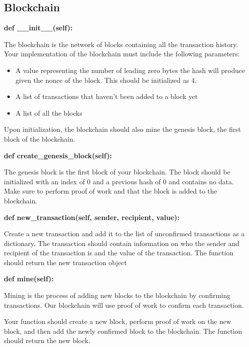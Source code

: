 \documentclass{article}
\begin{document}
\subsection{Blockchain}
\textbf{def \_\_init\_\_(self):} \par
The blockchain is the network of blocks containing all the transaction history. Your implementation of the blockchain must include the following parameters:
\begin{itemize}
  \item A value representing the number of leading zero bytes the hash will produce given the nonce of the block. This should be initialized as 4.
  \item A list of transactions that haven't been added to a block yet
  \item A list of all the blocks
\end{itemize}
Upon initialization, the blockchain should also mine the genesis block, the first block of the blockchain.\vspace{5mm}

\textbf{def create\_genesis\_block(self):}\par
The genesis block is the first block of your blockchain. The block should be initialized with an index of 0 and a previous hash of 0 and contains no data. Make sure to perform proof of work and that the block is added to the blockchain.
\vspace{5mm}


\textbf{def new\_transaction(self, sender, recipient, value):}\par

Create a new transaction and add it to the list of unconfirmed transactions as a dictionary. The transaction should contain information on who the sender and recipient of the transaction is and the value of the transaction. The function should return the new transaction object
\vspace{5mm}

\textbf{def mine(self):}\par
Mining is the process of adding new blocks to the blockchain by confirming transactions. Our blockchain will use proof of work to confirm each transaction. \par \vspace{5mm}
Your function should create a new block, perform proof of work on the new block, and then add the newly confirmed block to the blockchain. The function should return the new block.
\vspace{5mm}
\end{document}
